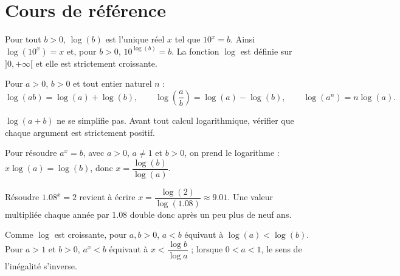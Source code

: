 
\section{Cours de référence}
\begin{keypoint}
Pour tout $b>0$, $\log(b)$ est l'unique réel $x$ tel que $10^x=b$. Ainsi $\log(10^x)=x$ et, pour $b>0$, $10^{\log(b)}=b$. La fonction $\log$ est définie sur $]0,+\infty[$ et elle est strictement croissante.
\end{keypoint}

\begin{center}
\end{center}

Pour $a>0$, $b>0$ et tout entier naturel $n$ :
\[
\log(ab)=\log(a)+\log(b),\qquad
\log\!\left(\frac{a}{b}\right)=\log(a)-\log(b),\qquad
\log(a^n)=n\log(a).
\]

\begin{pitfall}
$\log(a+b)$ ne se simplifie pas. Avant tout calcul logarithmique, vérifier que chaque argument est strictement positif.
\end{pitfall}

\begin{method}
Pour résoudre $a^x=b$, avec $a>0$, $a\neq1$ et $b>0$, on prend le logarithme : $x\log(a)=\log(b)$, donc $x=\dfrac{\log(b)}{\log(a)}$.
\end{method}

\begin{example}
Résoudre $\num{1,08}^x=2$ revient à écrire $x=\dfrac{\log(2)}{\log(\num{1,08})}\approx\num{9,01}$. Une valeur multipliée chaque année par $\num{1,08}$ double donc après un peu plus de neuf ans.
\end{example}

Comme $\log$ est croissante, pour $a,b>0$, $a<b$ équivaut à $\log(a)<\log(b)$. Pour $a>1$ et $b>0$, $a^x<b$ équivaut à $x<\dfrac{\log b}{\log a}$ ; lorsque $0<a<1$, le sens de l'inégalité s'inverse.

